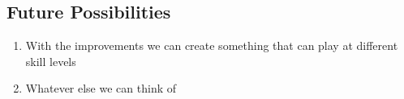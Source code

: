 \documentclass[12pt]{article}
\begin{document}
    \subsection{Future Possibilities}

    \begin{enumerate}
        \item With the improvements we can create something that can play at different skill levels 
        \item Whatever else we can think of
    \end{enumerate}
    
    \clearpage
    \printbibliography
\end{document}
